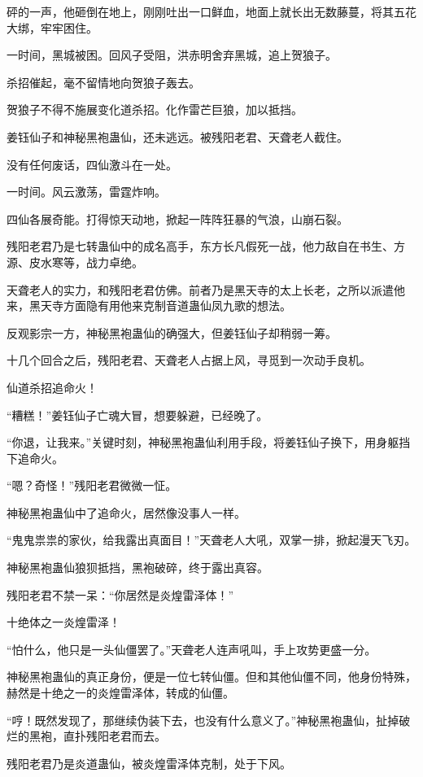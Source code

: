 \begin{this_body}
砰的一声，他砸倒在地上，刚刚吐出一口鲜血，地面上就长出无数藤蔓，将其五花大绑，牢牢困住。

一时间，黑城被困。回风子受阻，洪赤明舍弃黑城，追上贺狼子。

杀招催起，毫不留情地向贺狼子轰去。

贺狼子不得不施展变化道杀招。化作雷芒巨狼，加以抵挡。

姜钰仙子和神秘黑袍蛊仙，还未逃远。被残阳老君、天聋老人截住。

没有任何废话，四仙激斗在一处。

一时间。风云激荡，雷霆炸响。

四仙各展奇能。打得惊天动地，掀起一阵阵狂暴的气浪，山崩石裂。

残阳老君乃是七转蛊仙中的成名高手，东方长凡假死一战，他力敌自在书生、方源、皮水寒等，战力卓绝。

天聋老人的实力，和残阳老君仿佛。前者乃是黑天寺的太上长老，之所以派遣他来，黑天寺方面隐有用他来克制音道蛊仙凤九歌的想法。

反观影宗一方，神秘黑袍蛊仙的确强大，但姜钰仙子却稍弱一筹。

十几个回合之后，残阳老君、天聋老人占据上风，寻觅到一次动手良机。

仙道杀招追命火！

“糟糕！”姜钰仙子亡魂大冒，想要躲避，已经晚了。

“你退，让我来。”关键时刻，神秘黑袍蛊仙利用手段，将姜钰仙子换下，用身躯挡下追命火。

“嗯？奇怪！”残阳老君微微一怔。

神秘黑袍蛊仙中了追命火，居然像没事人一样。

“鬼鬼祟祟的家伙，给我露出真面目！”天聋老人大吼，双掌一排，掀起漫天飞刃。

神秘黑袍蛊仙狼狈抵挡，黑袍破碎，终于露出真容。

残阳老君不禁一呆：“你居然是炎煌雷泽体！”

十绝体之一炎煌雷泽！

“怕什么，他只是一头仙僵罢了。”天聋老人连声吼叫，手上攻势更盛一分。

神秘黑袍蛊仙的真正身份，便是一位七转仙僵。但和其他仙僵不同，他身份特殊，赫然是十绝之一的炎煌雷泽体，转成的仙僵。

“哼！既然发现了，那继续伪装下去，也没有什么意义了。”神秘黑袍蛊仙，扯掉破烂的黑袍，直扑残阳老君而去。

残阳老君乃是炎道蛊仙，被炎煌雷泽体克制，处于下风。


\end{this_body}
